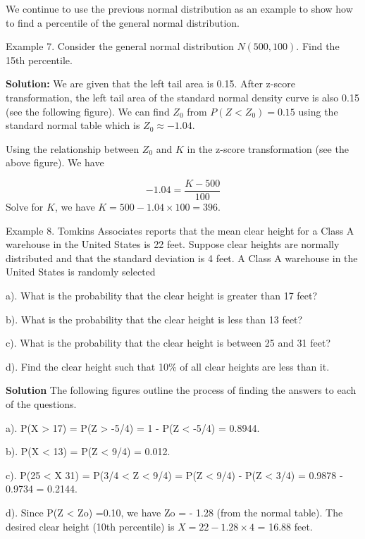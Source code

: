 \documentclass[
]{book}
\begin{document}
We continue to use the previous normal distribution as an example to show how to find a percentile of the general normal distribution.

Example 7. Consider the general normal distribution \(N(500, 100)\). Find the 15th percentile.

\textbf{Solution: } We are given that the left tail area is 0.15. After z-score transformation, the left tail area of the standard normal density curve is also 0.15 (see the following figure). We can find \(Z_0\) from \(P(Z < Z_0) = 0.15\) using the standard normal table which is \(Z_0 \approx -1.04\).

Using the relationship between \(Z_0\) and \(K\) in the z-score transformation (see the above figure). We have

\[
-1.04 = \frac{K - 500}{100}
\]
Solve for \(K\), we have \(K = 500 - 1.04\times 100 = 396\).

Example 8. Tomkins Associates reports that the mean clear height for a Class A warehouse in the United States is 22 feet. Suppose clear heights are normally distributed and that the standard deviation is 4 feet. A Class A warehouse in the United States is randomly selected

a). What is the probability that the clear height is greater than 17 feet?

b). What is the probability that the clear height is less than 13 feet?

c). What is the probability that the clear height is between 25 and 31 feet?

d). Find the clear height such that 10\% of all clear heights are less than it.

\textbf{Solution} The following figures outline the process of finding the answers to each of the questions.

a). P(X \textgreater{} 17) = P(Z \textgreater{} -5/4) = 1 - P(Z \textless{} -5/4) = 0.8944.

\hfill\break

b). P(X \textless{} 13) = P(Z \textless{} 9/4) = 0.012.

\hfill\break

c). P(25 \textless{} X 31) = P(3/4 \textless{} Z \textless{} 9/4) = P(Z \textless{} 9/4) - P(Z \textless{} 3/4) = 0.9878 - 0.9734 = 0.2144.

\hfill\break

d). Since P(Z \textless{} Zo) =0.10, we have Zo = - 1.28 (from the normal table). The desired clear height (10th percentile) is \(X = 22-1.28\times4\) = 16.88 feet.
\end{document}

